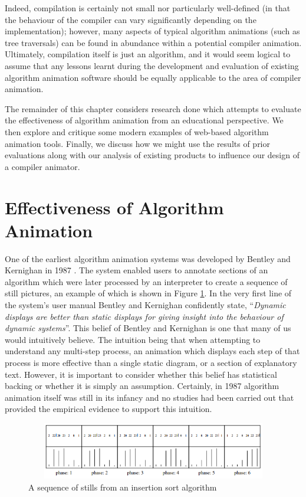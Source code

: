 \documentclass{l4proj}
\begin{document}
Indeed, compilation is certainly not small nor particularly well-defined (in that the behaviour of the compiler can vary significantly depending on the implementation); however, many aspects of typical algorithm animations (such as tree traversals) can be found in abundance within a potential compiler animation. Ultimately, compilation itself is just an algorithm,  and it would seem logical to assume that any lessons learnt during the development and evaluation of existing algorithm animation software should be equally applicable to the area of compiler animation. 

The remainder of this chapter considers research done which attempts to evaluate the effectiveness of algorithm animation from an educational perspective. We then explore and critique some modern examples of web-based algorithm animation tools. Finally, we discuss how we might use the results of prior evaluations along with our analysis of existing products to influence our design of a compiler animator.

\section{Effectiveness of Algorithm Animation}
One of the earliest algorithm animation systems was developed by Bentley and Kernighan in 1987 \cite{BentleyKernighan}. The system enabled users to annotate sections of an algorithm which were later processed by an interpreter to create a sequence of still pictures, an example of which is shown in Figure \ref{fig:bentley-kernighan}. In the very first line of the system's user manual Bentley and Kernighan confidently state, ``\textit{Dynamic displays are better than static displays for giving insight into the behaviour of dynamic systems}''. This belief of Bentley and Kernighan is one that many of us would intuitively believe. The intuition being that when attempting to understand any multi-step process, an animation which displays each step of that process is more effective than a single static diagram, or a section of explanatory text. However, it is important to consider whether this belief has statistical backing or whether it is simply an assumption. Certainly, in 1987 algorithm animation itself was still in its infancy and no studies had been carried out that provided the empirical evidence to support this intuition. 

\begin{figure}
\centering
\includegraphics[height=2.5cm,width=13cm]{images/bentleykernighan.png}
\caption{A sequence of stills from an insertion sort algorithm}
\label{fig:bentley-kernighan}	
\end{figure}
\end{document}
